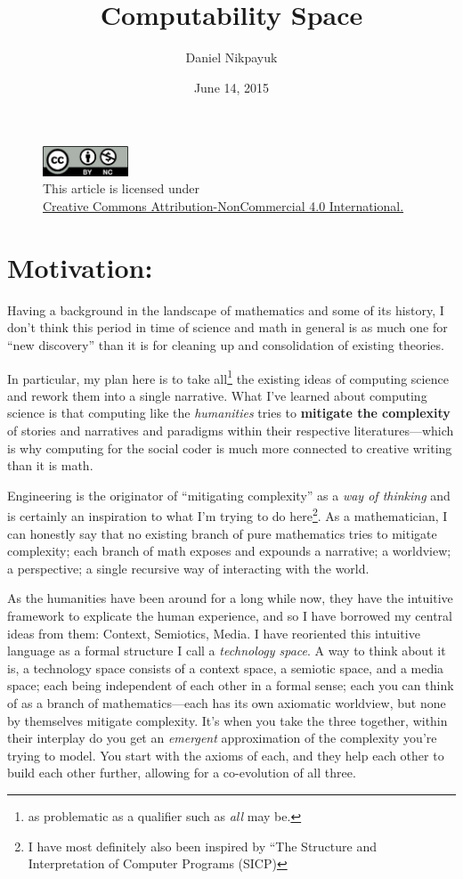 \documentclass[twoside]{article}
\title{Computability Space}
\author{Daniel Nikpayuk}
\date{June 14, 2015}
\begin{document}
\maketitle
\begin{figure}[h]
\centering
\includegraphics[width=1in]{cc-by-nc.png}\\[0.1in]
\tiny This article is licensed under \\
\href{http://creativecommons.org/licenses/by-nc/4.0/}
{Creative Commons Attribution-NonCommercial 4.0 International.}\\[0.3in]
\end{figure}

\section*{Motivation:}

Having a background in the landscape of mathematics and some of its history, I don't think this period in time of science
and math in general is as much one for ``new discovery'' than it is for cleaning up and consolidation of existing theories.

In particular, my plan here is to take all\footnote{as problematic as a qualifier such as \emph{all} may be.} the existing
ideas of computing science and rework them into a single narrative.  What I've learned about computing science is that
computing like the \emph{humanities} tries to {\bfseries mitigate the complexity} of stories and narratives and paradigms
within their respective literatures---which is why computing for the social coder is much more connected to creative writing
than it is math.

Engineering is the originator of ``mitigating complexity'' as a \emph{way of thinking} and is certainly an inspiration to what I'm
trying to do here\footnote{I have most definitely also been inspired by ``The Structure and Interpretation of Computer Programs (SICP)}.
As a mathematician, I can honestly say that no existing branch of pure mathematics tries to mitigate complexity; each branch of math
exposes and expounds a narrative; a worldview; a perspective; a single recursive way of interacting with the world.

As the humanities have been around for a long while now, they have the intuitive framework to explicate the human experience, and so
I have borrowed my central ideas from them: Context, Semiotics, Media. I have reoriented this intuitive language as a formal structure
I call a \emph{technology space}. A way to think about it is, a technology space consists of a context space, a semiotic space, and a
media space; each being independent of each other in a formal sense; each you can think of as a branch of mathematics---each has its
own axiomatic worldview, but none by themselves mitigate complexity. It's when you take the three together, within their interplay do
you get an \emph{emergent} approximation of the complexity you're trying to model. You start with the axioms of each, and they help each
other to build each other further, allowing for a co-evolution of all three.
\end{document}
